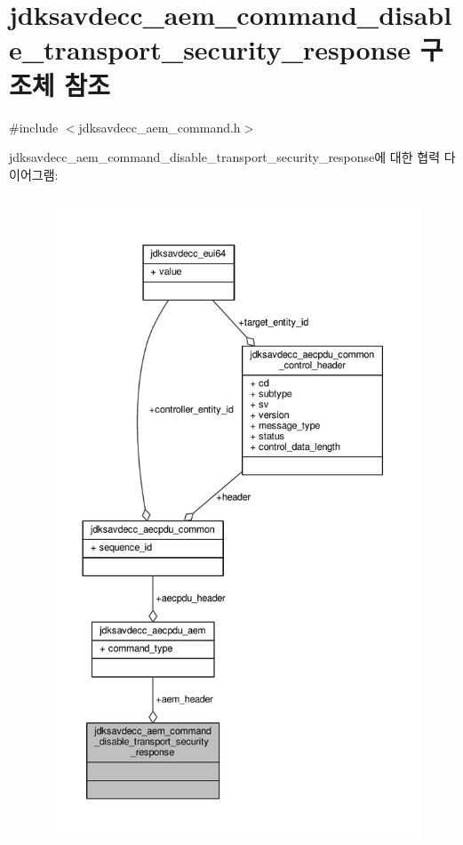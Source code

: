 \hypertarget{structjdksavdecc__aem__command__disable__transport__security__response}{}\section{jdksavdecc\+\_\+aem\+\_\+command\+\_\+disable\+\_\+transport\+\_\+security\+\_\+response 구조체 참조}
\label{structjdksavdecc__aem__command__disable__transport__security__response}


{\ttfamily \#include $<$jdksavdecc\+\_\+aem\+\_\+command.\+h$>$}



jdksavdecc\+\_\+aem\+\_\+command\+\_\+disable\+\_\+transport\+\_\+security\+\_\+response에 대한 협력 다이어그램\+:
\nopagebreak
\begin{figure}[H]
\begin{center}
\leavevmode
\includegraphics[height=550pt]{structjdksavdecc__aem__command__disable__transport__security__response__coll__graph}
\end{center}
\end{figure}
